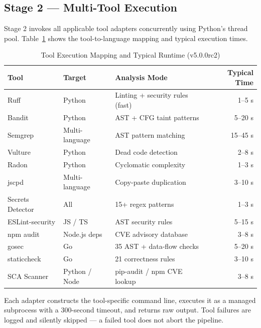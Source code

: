 \subsection{Stage 2 --- Multi-Tool Execution}

Stage 2 invokes all applicable tool adapters concurrently using Python's thread pool. Table~\ref{tab:tool_execution} shows the tool-to-language mapping and typical execution times.

\begin{table}[htbp]
\caption{Tool Execution Mapping and Typical Runtime (v5.0.0rc2)}
\label{tab:tool_execution}
\centering
\renewcommand{\arraystretch}{1.3}
\begin{tabularx}{\textwidth}{@{} l l X r @{}}
\toprule
\textbf{Tool} & \textbf{Target} & \textbf{Analysis Mode} & \textbf{Typical Time} \\
\midrule
Ruff             & Python          & Linting + security rules (fast)    & 1--5 s   \\
Bandit           & Python          & AST + CFG taint patterns           & 5--20 s  \\
Semgrep          & Multi-language  & AST pattern matching               & 15--45 s \\
Vulture          & Python          & Dead code detection                & 2--8 s   \\
Radon            & Python          & Cyclomatic complexity              & 1--3 s   \\
jscpd            & Multi-language  & Copy-paste duplication             & 3--10 s  \\
Secrets Detector & All             & 15+ regex patterns                 & 1--3 s   \\
ESLint-security  & JS / TS         & AST security rules                 & 5--15 s  \\
npm audit        & Node.js deps    & CVE advisory database              & 3--8 s   \\
gosec            & Go              & 35 AST + data-flow checks          & 5--20 s  \\
staticcheck      & Go              & 21 correctness rules               & 3--10 s  \\
SCA Scanner      & Python / Node   & pip-audit / npm CVE lookup         & 3--8 s   \\
\bottomrule
\end{tabularx}
\end{table}

Each adapter constructs the tool-specific command line, executes it as a managed subprocess with a 300-second timeout, and returns raw output. Tool failures are logged and silently skipped --- a failed tool does not abort the pipeline.

